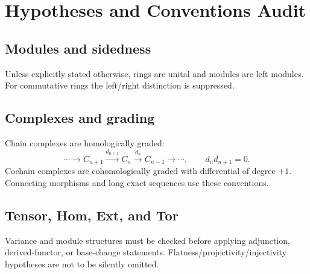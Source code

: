 \chapter*{Hypotheses and Conventions Audit}
{}

\section*{Modules and sidedness}
Unless explicitly stated otherwise, rings are unital and modules are left
modules.  For commutative rings the left/right distinction is suppressed.

\section*{Complexes and grading}
Chain complexes are homologically graded:
\[
\cdots\longrightarrow C_{n+1}\xrightarrow{d_{n+1}}C_n
\xrightarrow{d_n}C_{n-1}\longrightarrow\cdots,
\qquad d_n d_{n+1}=0.
\]
Cochain complexes are cohomologically graded with differential of degree \(+1\).
Connecting morphisms and long exact sequences use these conventions.

\section*{Tensor, Hom, Ext, and Tor}
Variance and module structures must be checked before applying adjunction,
derived-functor, or base-change statements.  Flatness/projectivity/injectivity
hypotheses are not to be silently omitted.
